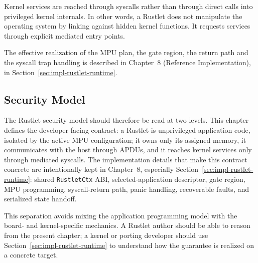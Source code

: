 Kernel services are reached through syscalls rather than through direct
calls into privileged kernel internals. In other words, a Rustlet does
not manipulate the operating system by linking against hidden kernel
functions. It requests services through explicit mediated entry points.

The effective realization of the MPU plan, the gate region, the return
path and the syscall trap handling is described in Chapter~8 (Reference
Implementation), in Section~\ref{sec:impl-rustlet-runtime}.

\subsection{Security Model}

The Rustlet security model should therefore be read at two levels. This
chapter defines the developer-facing contract: a Rustlet is unprivileged
application code, isolated by the active MPU configuration;
it owns only its assigned memory, it communicates with
the host through APDUs, and it reaches kernel services only through
mediated syscalls. The implementation details that make this contract
concrete are intentionally kept in Chapter~8, especially
Section~\ref{sec:impl-rustlet-runtime}: shared \texttt{RustletCtx} ABI,
selected-application descriptor, gate region, MPU programming,
syscall-return path, panic handling, recoverable faults, and serialized
state handoff.

This separation avoids mixing the application programming model with the
board- and kernel-specific mechanics. A Rustlet author should be able to
reason from the present chapter; a kernel or porting developer should use
Section~\ref{sec:impl-rustlet-runtime} to understand how the guarantee is
realized on a concrete target.

